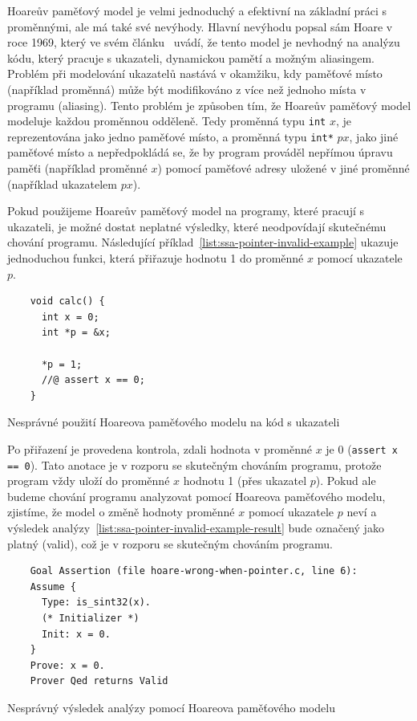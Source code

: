 
Hoareův paměťový model je velmi jednoduchý a efektivní na základní práci s proměnnými, ale má také své nevýhody.
Hlavní nevýhodu popsal sám Hoare v roce 1969, který ve svém článku~\cite{Hoare1969} uvádí,
že tento model je nevhodný na analýzu kódu, který pracuje s ukazateli, dynamickou pamětí a možným aliasingem.
Problém při modelování ukazatelů nastává v okamžiku,
kdy paměťové místo (například proměnná) může být modifikováno z více než jednoho místa v programu (aliasing).
Tento problém je způsoben tím, že Hoareův paměťový model modeluje každou proměnnou odděleně.
Tedy proměnná typu \texttt{int} $x$, je reprezentována jako jedno paměťové místo,
a proměnná typu \texttt{int*} $px$, jako jiné paměťové místo a nepředpokládá se,
že by program prováděl nepřímou úpravu paměťi (například proměnné $x$) pomocí paměťové adresy
uložené v jiné proměnné (například ukazatelem $px$).

Pokud použijeme Hoareův paměťový model na programy, které pracují s ukazateli,
je možné dostat neplatné výsledky, které neodpovídají skutečnému chování programu.
Následující příklad~\ref{list:ssa-pointer-invalid-example} ukazuje jednoduchou funkci,
která přiřazuje hodnotu 1 do proměnné $x$ pomocí ukazatele $p$.

\begin{listing}[H]
    \begin{verbatim}
    void calc() {
      int x = 0;
      int *p = &x;

      *p = 1;
      //@ assert x == 0;
    }
    \end{verbatim}
    \caption{Nesprávné použití Hoareova paměťového modelu na kód s ukazateli}
    \label{list:ssa-pointer-invalid-example}
\end{listing}

Po přiřazení je provedena kontrola, zdali hodnota v proměnné $x$ je 0 (\texttt{assert x == 0}).
Tato anotace je v rozporu se skutečným chováním programu,
protože program vždy uloží do proměnné $x$ hodnotu 1 (přes ukazatel $p$).
Pokud ale budeme chování programu analyzovat pomocí Hoareova paměťového modelu,
zjistíme, že model o změně hodnoty proměnné $x$ pomocí ukazatele $p$ neví
a výsledek analýzy~\ref{list:ssa-pointer-invalid-example-result} bude označený jako platný (valid),
což je v rozporu se skutečným chováním programu.

\begin{listing}[H]
    \begin{verbatim}
    Goal Assertion (file hoare-wrong-when-pointer.c, line 6):
    Assume {
      Type: is_sint32(x).
      (* Initializer *)
      Init: x = 0.
    }
    Prove: x = 0.
    Prover Qed returns Valid
    \end{verbatim}
    \caption{Nesprávný výsledek analýzy pomocí Hoareova paměťového modelu}
    \label{list:ssa-pointer-invalid-example-result}
\end{listing}

